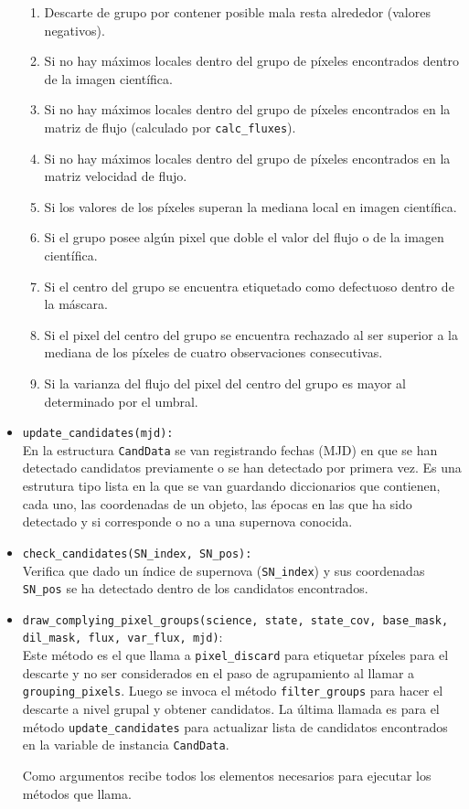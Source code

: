 \begin{itemize}
\begin{enumerate}
\item Descarte de grupo por contener posible mala resta alrededor (valores negativos).  
\item	Si no hay m\'aximos locales dentro del grupo de p\'ixeles encontrados dentro de la imagen cient\'ifica.
\item	Si no hay m\'aximos locales dentro del grupo de p\'ixeles encontrados en la matriz de flujo (calculado por \texttt{calc\_fluxes}).
\item	Si no hay m\'aximos locales dentro del grupo de p\'ixeles encontrados en la matriz velocidad de flujo.
\item 	Si los valores de los p\'ixeles superan la mediana local en imagen cient\'ifica.
\item	Si el grupo posee alg\'un pixel que doble el valor del flujo o de la imagen cient\'ifica.
\item	Si el centro del grupo se encuentra etiquetado como defectuoso dentro de la m\'ascara.
\item	Si el pixel del centro del grupo se encuentra rechazado al ser superior a la mediana de los p\'ixeles de cuatro observaciones consecutivas.
\item	Si la varianza del flujo del pixel del centro del grupo es mayor al determinado por el umbral.
\end{enumerate} 
\item \texttt{update\_candidates(mjd):}\\
En la estructura \texttt{CandData} se van registrando fechas (MJD) en que se han detectado candidatos previamente o se han detectado por primera vez. Es una estrutura tipo lista en la que se van guardando diccionarios que contienen, cada uno, las coordenadas de un objeto, las \'epocas en las que ha sido detectado y si corresponde o no a una supernova conocida.

\item \texttt{check\_candidates(SN\_index, SN\_pos):}\\
Verifica que dado un \'indice de supernova (\texttt{SN\_index}) y sus coordenadas \texttt{SN\_pos} se ha detectado dentro de los candidatos encontrados. 

\item \texttt{draw\_complying\_pixel\_groups(science, state, state\_cov, base\_mask, dil\_mask, flux, var\_flux, mjd)}:\\
Este m\'etodo es el que llama a \texttt{pixel\_discard} para etiquetar p\'ixeles para el descarte y no ser considerados en el paso de agrupamiento al llamar a \texttt{grouping\_pixels}. Luego se invoca el m\'etodo \texttt{filter\_groups} para hacer el descarte a nivel grupal y obtener candidatos. La \'ultima llamada es para el m\'etodo \texttt{update\_candidates} para actualizar lista de candidatos encontrados en la variable de instancia \texttt{CandData}.
\bigskip

Como argumentos recibe todos los elementos necesarios para ejecutar los m\'etodos que llama.

\end{itemize}

